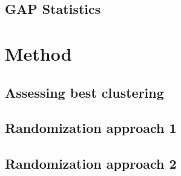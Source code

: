 \documentclass[a4paper,10pt]{article}
\theoremstyle{plain}
\theoremstyle{definition}
\begin{document}
\subsection{GAP Statistics}

\newpage
\section{Method}

\subsection{Assessing best clustering}

\subsection{Randomization approach 1}

\subsection{Randomization approach 2}
\end{document}
